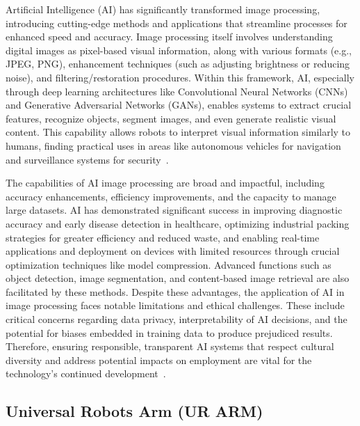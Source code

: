 \documentclass[12pt]{extarticle}
\begin{document}
Artificial Intelligence (AI) has significantly transformed image processing, introducing cutting-edge methods and applications that streamline processes for enhanced speed and accuracy. Image processing itself involves understanding digital images as pixel-based visual information, along with various formats (e.g., JPEG, PNG), enhancement techniques (such as adjusting brightness or reducing noise), and filtering/restoration procedures. Within this framework, AI, especially through deep learning architectures like Convolutional Neural Networks (CNNs) and Generative Adversarial Networks (GANs), enables systems to extract crucial features, recognize objects, segment images, and even generate realistic visual content. This capability allows robots to interpret visual information similarly to humans, finding practical uses in areas like autonomous vehicles for navigation and surveillance systems for security~\cite{ai-in-image-processing}.

The capabilities of AI image processing are broad and impactful, including accuracy enhancements, efficiency improvements, and the capacity to manage large datasets. AI has demonstrated significant success in improving diagnostic accuracy and early disease detection in healthcare, optimizing industrial packing strategies for greater efficiency and reduced waste, and enabling real-time applications and deployment on devices with limited resources through crucial optimization techniques like model compression. Advanced functions such as object detection, image segmentation, and content-based image retrieval are also facilitated by these methods. Despite these advantages, the application of AI in image processing faces notable limitations and ethical challenges. These include critical concerns regarding data privacy, interpretability of AI decisions, and the potential for biases embedded in training data to produce prejudiced results. Therefore, ensuring responsible, transparent AI systems that respect cultural diversity and address potential impacts on employment are vital for the technology's continued development~\cite{ai-in-image-processing}.

\subsection{Universal Robots Arm (UR ARM)}
\end{document}
